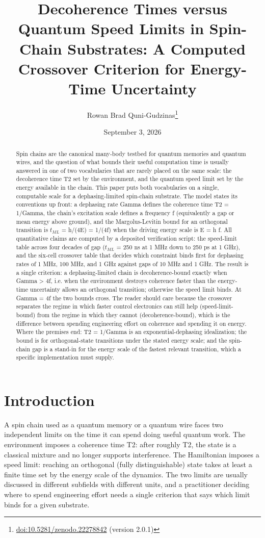\documentclass[11pt]{article}
\title{Decoherence Times versus Quantum Speed Limits in Spin-Chain Substrates: A Computed Crossover Criterion for Energy-Time Uncertainty}
\author{Rowan Brad Quni-Gudzinas\thanks{\href{https://doi.org/10.5281/zenodo.22278842}{doi:10.5281/zenodo.22278842} (version 2.0.1)}}
\date{September 3, 2026}
\begin{document}
\maketitle
\begin{abstract}
Spin chains are the canonical many-body testbed for quantum memories and quantum wires, and the question of what bounds their useful computation time is usually answered in one of two vocabularies that are rarely placed on the same scale: the decoherence time T2 set by the environment, and the quantum speed limit set by the energy available in the chain. This paper puts both vocabularies on a single, computable scale for a dephasing-limited spin-chain substrate. The model states its conventions up front: a dephasing rate Gamma defines the coherence time T2 = 1/Gamma, the chain's excitation scale defines a frequency f (equivalently a gap or mean energy above ground), and the Margolus-Levitin bound for an orthogonal transition is $t_{ML}$ = h/(4E) = 1/(4f) when the driving energy scale is E = h f. All quantitative claims are computed by a deposited verification script: the speed-limit table across four decades of gap ($t_{ML}$ = 250 ns at 1 MHz down to 250 ps at 1 GHz), and the six-cell crossover table that decides which constraint binds first for dephasing rates of 1 MHz, 100 MHz, and 1 GHz against gaps of 10 MHz and 1 GHz. The result is a single criterion: a dephasing-limited chain is decoherence-bound exactly when Gamma > 4f, i.e. when the environment destroys coherence faster than the energy-time uncertainty allows an orthogonal transition; otherwise the speed limit binds. At Gamma = 4f the two bounds cross. The reader should care because the crossover separates the regime in which faster control electronics can still help (speed-limit-bound) from the regime in which they cannot (decoherence-bound), which is the difference between spending engineering effort on coherence and spending it on energy. Where the premises end: T2 = 1/Gamma is an exponential-dephasing idealization; the bound is for orthogonal-state transitions under the stated energy scale; and the spin-chain gap is a stand-in for the energy scale of the fastest relevant transition, which a specific implementation must supply.
\end{abstract}
\section{Introduction}
A spin chain used as a quantum memory or a quantum wire faces two independent limits on the time it can spend doing useful quantum work. The environment imposes a coherence time T2: after roughly T2, the state is a classical mixture and no longer supports interference. The Hamiltonian imposes a speed limit: reaching an orthogonal (fully distinguishable) state takes at least a finite time set by the energy scale of the dynamics. The two limits are usually discussed in different subfields with different units, and a practitioner deciding where to spend engineering effort needs a single criterion that says which limit binds for a given substrate.
\end{document}
